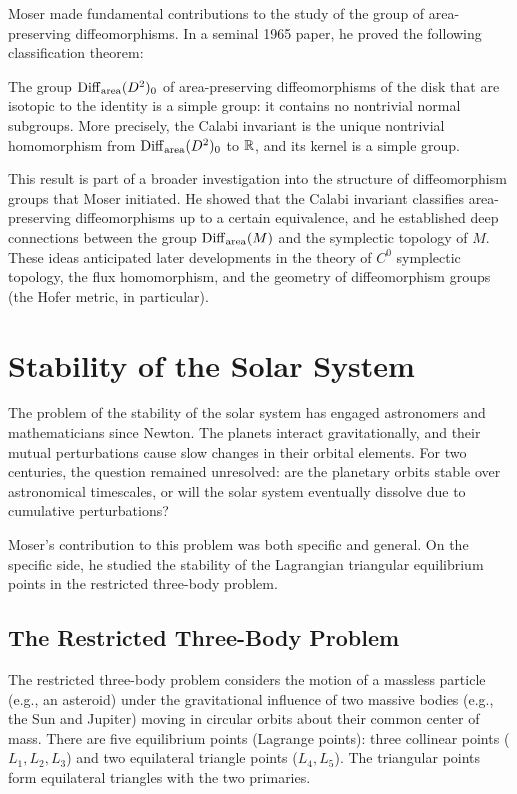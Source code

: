 Moser made fundamental contributions to the study of the group of area-preserving diffeomorphisms. In a seminal 1965 paper, he proved the following classification theorem:

\begin{theorem}[Moser, 1965]
The group $\operatorname{Diff}_{\operatorname{area}}(D^2)_0$ of area-preserving diffeomorphisms of the disk that are isotopic to the identity is a simple group: it contains no nontrivial normal subgroups. More precisely, the Calabi invariant is the unique nontrivial homomorphism from $\operatorname{Diff}_{\operatorname{area}}(D^2)_0$ to $\mathbb{R}$, and its kernel is a simple group.
\end{theorem}

This result is part of a broader investigation into the structure of diffeomorphism groups that Moser initiated. He showed that the Calabi invariant classifies area-preserving diffeomorphisms up to a certain equivalence, and he established deep connections between the group $\operatorname{Diff}_{\operatorname{area}}(M)$ and the symplectic topology of $M$. These ideas anticipated later developments in the theory of $C^0$ symplectic topology, the flux homomorphism, and the geometry of diffeomorphism groups (the Hofer metric, in particular).

\section{Stability of the Solar System}

The problem of the stability of the solar system has engaged astronomers and mathematicians since Newton. The planets interact gravitationally, and their mutual perturbations cause slow changes in their orbital elements. For two centuries, the question remained unresolved: are the planetary orbits stable over astronomical timescales, or will the solar system eventually dissolve due to cumulative perturbations?

Moser's contribution to this problem was both specific and general. On the specific side, he studied the stability of the Lagrangian triangular equilibrium points in the restricted three-body problem.

\subsection{The Restricted Three-Body Problem}

The restricted three-body problem considers the motion of a massless particle (e.g., an asteroid) under the gravitational influence of two massive bodies (e.g., the Sun and Jupiter) moving in circular orbits about their common center of mass. There are five equilibrium points (Lagrange points): three collinear points ($L_1, L_2, L_3$) and two equilateral triangle points ($L_4, L_5$). The triangular points form equilateral triangles with the two primaries.

